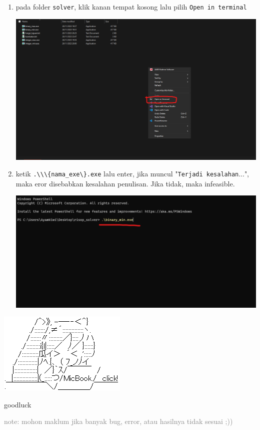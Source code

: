 \documentclass[12pt]{article}
\newcommand{\inline}[1]{\lstinline[basicstyle=\footnotesize\color{black}\ttfamily]|#1|}
\begin{document}
\begin{enumerate}
{        \begin{enumerate}
            \item {
                pada folder \inline{solver}, klik kanan tempat kosong lalu pilih \inline{Open in terminal}
                \begin{center}
                    \includegraphics[scale=0.3]{1.png}
                \end{center}
            }\newpage
            \item {
                ketik \inline{.\\\{nama_exe\}.exe} lalu enter, jika muncul "\inline{Terjadi kesalahan}...", maka eror disebabkan kesalahan penulisan. Jika tidak, maka infeasible.
                \begin{center}
                    \includegraphics[scale=0.4]{2.png}
                \end{center}
            }
        \end{enumerate}
    }
\end{enumerate}
\vfil
\begin{center}
    \includegraphics[]{hatsune_miku_24.png}
    
    goodluck

    \textcolor{gray}{note: mohon maklum jika banyak bug, error, atau hasilnya tidak sesuai ;))}
\end{center}
\end{document}
